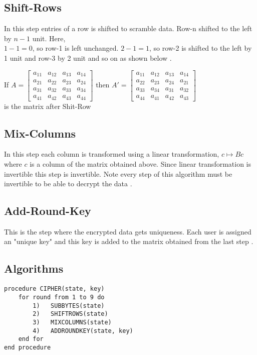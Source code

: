 \vspace{3mm}
\subsection{Shift-Rows}
In this step entries of a row is shifted to scramble data. Row-n shifted to the left by \(n-1\) unit. Here,\\
\(1-1=0\), so row-1 is left unchanged. \(2-1=1\), so row-2 is shifted to the left by 1 unit and row-3 by 2 unit and so on as shown below \cite{aes}.

\vspace{3mm}
If \(A=\begin{bmatrix}
    a_{11}&a_{12}&a_{13}&a_{14}\\
    a_{21}&a_{22}&a_{23}&a_{24}\\
    a_{31}&a_{32}&a_{33}&a_{34}\\
    a_{41}&a_{42}&a_{43}&a_{44}
    \end{bmatrix}\) \hspace{3mm} then \(A'=\begin{bmatrix}
    a_{11}&a_{12}&a_{13}&a_{14}\\
    a_{22}&a_{23}&a_{24}&a_{21}\\
    a_{33}&a_{34}&a_{31}&a_{32}\\
    a_{44}&a_{41}&a_{42}&a_{43}
    \end{bmatrix}\) \vspace{2mm} \\[3mm] is the matrix after Shit-Row

\subsection{Mix-Columns}
In this step each column is transformed using a linear transformation, \(c \mapsto Bc\) where \(c\) is a column of the matrix obtained above. Since linear transformation is invertible this step is invertible. Note every step of this algorithm must be invertible to be able to decrypt the data \cite{aes}.

\subsection{Add-Round-Key}
This is the step where the encrypted data gets uniqueness. Each user is assigned an "unique key" and this key is added to the matrix obtained from the last step \cite{aes}.

\subsection{Algorithms}
\begin{tcolorbox}[colback=gray!20, colframe=blue!30, left=2cm, boxsep=-1pt, title={\small \bfseries \textcolor{black}{Encryption Algorithm}}, width=15cm]
\begin{verbatim}
procedure CIPHER(state, key)
    for round from 1 to 9 do
        1)   SUBBYTES(state)
        2)   SHIFTROWS(state)
        3)   MIXCOLUMNS(state)
        4)   ADDROUNDKEY(state, key)
    end for
end procedure
\end{verbatim} \cite{aes}
\end{tcolorbox}

